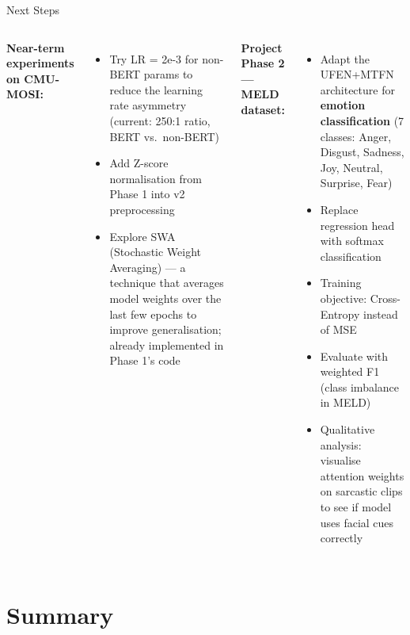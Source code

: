 \documentclass[aspectratio=169]{beamer}
\begin{document}
\begin{frame}{Next Steps}
  \begin{columns}[T]
      \textbf{Near-term experiments on CMU-MOSI:}
      \begin{itemize}
        \item Try LR = 2e-3 for non-BERT params to reduce the learning rate
          asymmetry (current: 250:1 ratio, BERT vs.\ non-BERT)
        \item Add Z-score normalisation from Phase 1 into v2 preprocessing
        \item Explore SWA (Stochastic Weight Averaging) — a technique that
          averages model weights over the last few epochs to improve
          generalisation; already implemented in Phase 1's code
      \end{itemize}

      \textbf{Project Phase 2 — MELD dataset:}
      \begin{itemize}
        \item Adapt the UFEN+MTFN architecture for \textbf{emotion
          classification} (7 classes: Anger, Disgust, Sadness, Joy,
          Neutral, Surprise, Fear)
        \item Replace regression head with softmax classification
        \item Training objective: Cross-Entropy instead of MSE
        \item Evaluate with weighted F1 (class imbalance in MELD)
        \item Qualitative analysis: visualise attention weights on
          sarcastic clips to see if model uses facial cues correctly
      \end{itemize}
  \end{columns}
\end{frame}

\section{Summary}
\end{document}
